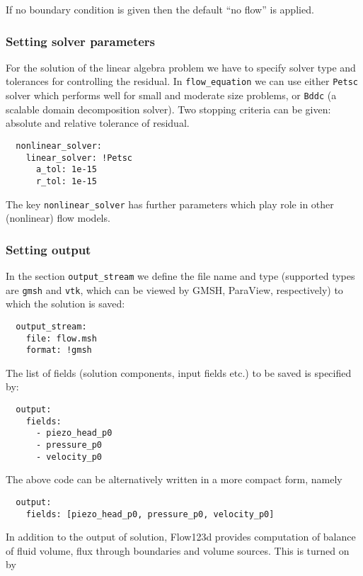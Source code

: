 If no boundary condition is given then the default ``no flow'' is
applied.

\subsubsection{Setting solver parameters}

For the solution of the linear algebra problem we have to specify solver
type and tolerances for controlling the residual. In
\texttt{flow\_equation} we can use either \texttt{Petsc} solver which
performs well for small and moderate size problems, or \texttt{Bddc} (a
scalable domain decomposition solver). Two stopping criteria can be
given: absolute and relative tolerance of residual.

\begin{verbatim}
  nonlinear_solver:
    linear_solver: !Petsc
      a_tol: 1e-15
      r_tol: 1e-15
\end{verbatim}

The key \texttt{nonlinear\_solver} has further parameters which play
role in other (nonlinear) flow models.

\subsubsection{Setting output}

In the section \texttt{output\_stream} we define the file name and type
(supported types are \texttt{gmsh} and \texttt{vtk}, which can be viewed
by GMSH, ParaView, respectively) to which the solution is saved:

\begin{verbatim}
  output_stream:
    file: flow.msh
    format: !gmsh
\end{verbatim}

The list of fields (solution components, input fields etc.) to be saved
is specified by:

\begin{verbatim}
  output:
    fields:
      - piezo_head_p0
      - pressure_p0
      - velocity_p0
\end{verbatim}

The above code can be alternatively written in a more compact form,
namely

\begin{verbatim}
  output:
    fields: [piezo_head_p0, pressure_p0, velocity_p0]
\end{verbatim}

In addition to the output of solution, Flow123d provides computation of
balance of fluid volume, flux through boundaries and volume sources.
This is turned on by

